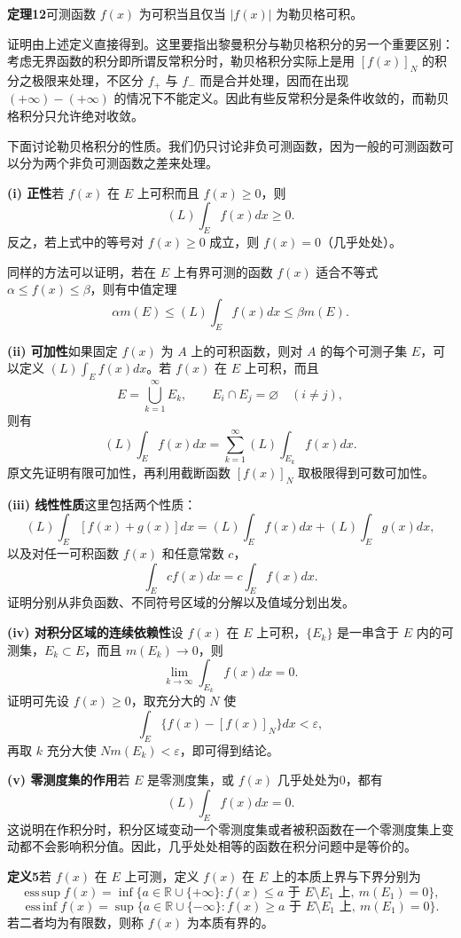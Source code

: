 \noindent\textbf{定理12}\quad 可测函数 $f(x)$ 为可积当且仅当 $|f(x)|$ 为勒贝格可积。

证明由上述定义直接得到。这里要指出黎曼积分与勒贝格积分的另一个重要区别：考虑无界函数的积分即所谓反常积分时，勒贝格积分实际上是用 $[f(x)]_N$ 的积分之极限来处理，不区分 $f_+$ 与 $f_-$ 而是合并处理，因而在出现 $(+\infty)-(+\infty)$ 的情况下不能定义。因此有些反常积分是条件收敛的，而勒贝格积分只允许绝对收敛。

下面讨论勒贝格积分的性质。我们仍只讨论非负可测函数，因为一般的可测函数可以分为两个非负可测函数之差来处理。

\noindent\textbf{(i) 正性}\quad 若 $f(x)$ 在 $E$ 上可积而且 $f(x)\ge0$，则
\[
(L)\int_Ef(x)dx\ge0. \tag{28}
\]
反之，若上式中的等号对 $f(x)\ge0$ 成立，则 $f(x)=0$（几乎处处）。

同样的方法可以证明，若在 $E$ 上有界可测的函数 $f(x)$ 适合不等式 $\alpha\le f(x)\le\beta$，则有中值定理
\[
\alpha m(E)\le(L)\int_Ef(x)dx\le\beta m(E). \tag{29}
\]

\noindent\textbf{(ii) 可加性}\quad 如果固定 $f(x)$ 为 $A$ 上的可积函数，则对 $A$ 的每个可测子集 $E$，可以定义 $(L)\int_Ef(x)dx$。若 $f(x)$ 在 $E$ 上可积，而且
\[
E=\bigcup_{k=1}^{\infty}E_k,\qquad E_i\cap E_j=\varnothing\quad(i\ne j),
\]
则有
\[
(L)\int_Ef(x)dx=\sum_{k=1}^{\infty}(L)\int_{E_k}f(x)dx. \tag{30}
\]
原文先证明有限可加性，再利用截断函数 $[f(x)]_N$ 取极限得到可数可加性。

\noindent\textbf{(iii) 线性性质}\quad 这里包括两个性质：
\[
(L)\int_E[f(x)+g(x)]dx=(L)\int_Ef(x)dx+(L)\int_Eg(x)dx, \tag{33}
\]
以及对任一可积函数 $f(x)$ 和任意常数 $c$，
\[
\int_Ecf(x)dx=c\int_Ef(x)dx. \tag{34}
\]
证明分别从非负函数、不同符号区域的分解以及值域分划出发。

\noindent\textbf{(iv) 对积分区域的连续依赖性}\quad 设 $f(x)$ 在 $E$ 上可积，$\{E_k\}$ 是一串含于 $E$ 内的可测集，$E_k\subset E$，而且 $m(E_k)\to0$，则
\[
\lim_{k\to\infty}\int_{E_k}f(x)dx=0.
\]
证明可先设 $f(x)\ge0$，取充分大的 $N$ 使
\[
\int_E\{f(x)-[f(x)]_N\}dx<\varepsilon,
\]
再取 $k$ 充分大使 $Nm(E_k)<\varepsilon$，即可得到结论。

\noindent\textbf{(v) 零测度集的作用}\quad 若 $E$ 是零测度集，或 $f(x)$ 几乎处处为0，都有
\[
(L)\int_Ef(x)dx=0. \tag{35}
\]
这说明在作积分时，积分区域变动一个零测度集或者被积函数在一个零测度集上变动都不会影响积分值。因此，几乎处处相等的函数在积分问题中是等价的。

\noindent\textbf{定义5}\quad 若 $f(x)$ 在 $E$ 上可测，定义 $f(x)$ 在 $E$ 上的本质上界与下界分别为
\[
\operatorname*{ess\,sup}f(x)=\inf\{a\in\mathbb R\cup\{+\infty\}:f(x)\le a\text{ 于 }E\setminus E_1\text{ 上},\ m(E_1)=0\},
\]
\[
\operatorname*{ess\,inf}f(x)=\sup\{a\in\mathbb R\cup\{-\infty\}:f(x)\ge a\text{ 于 }E\setminus E_1\text{ 上},\ m(E_1)=0\}.
\]
若二者均为有限数，则称 $f(x)$ 为本质有界的。

